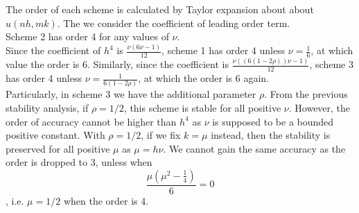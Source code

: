 \documentclass[a4paper,11pt]{article}
\begin{document}
\begin{enumerate}[label = (\roman*)]
The order of each scheme is calculated by Taylor expansion about about $u(nh,mk)$. The we consider the coefficient of leading order term. \\Scheme 2 has order 4 for any values of $\nu$. \\Since the coefficient of $h^4$ is $\frac{\nu(6\nu-1)}{12}$, scheme 1 has order 4 unless $\nu = \frac{1}{6}$, at which value the order is 6. Similarly, since the coefficient is $\frac{\nu((6(1-2\rho))\nu-1)}{12}$, scheme 3 has order 4 unless $\nu = \frac{1}{6(1-2\rho)}$, at which the order is 6 again.\\

Particularly, in scheme 3 we have the additional parameter $\rho$. From the previous stability analysis, if $\rho = 1/2$, this scheme is stable for all positive $\nu$. However, the order of accuracy cannot be higher than $h^4$ as $\nu$ is supposed to be a bounded positive constant. With $\rho = 1/2$, if we fix $k = \mu$ instead, then the stability is preserved for all positive $\mu$ as $\mu = h\nu$. We cannot gain the same accuracy as the order is dropped to 3, unless when $$\frac{\mu(\mu^2-\frac{1}{4})}{6} = 0$$, i.e. $\mu = 1/2$ when the order is 4.


\end{enumerate}
\end{document}
